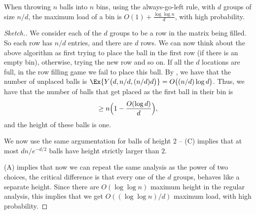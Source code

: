 \begin{theorem}
    When throwing $n$ balls into $n$ bins, using the always-go-left
    rule, with $d$ groups of size $n/d$, the maximum load of a bin is
    $O(1) + \tfrac{\log \log n}{d}$, with high probability.
\end{theorem}
\begin{proof}[Sketch.]
    We consider each of the $d$ groups to be a row in the matrix being
    filled. So each row has $n/d$ entries, and there are $d$ rows. We
    can now think about the above algorithm as first trying to place
    the ball in the first row (if there is an empty bin), otherwise,
    trying the new row and so on. If all the $d$ locations are full,
    in the row filling game we fail to place this ball.  By
     , we have that the
    number of unplaced balls is
    $\Ex{\bigl. Y\bigl(d,n/d, (n/d) d\bigr)} = O\bigl( (n/d) \log d
    \bigr) $.  Thus, we have that the number of balls that get placed
    as the first ball in their bin is
    \begin{equation*}
        \geq n\Bigl(1-\frac{O(\log d)}{d}\Bigr),
    \end{equation*}
    and the height of these balls is one.

    We now use the same argumentation for balls of height 2 --
     (C) implies that at most $dn/e^{-d/2}$
    balls have height strictly larger than $2$. 

     (A) implies that now we can repeat the same
    analysis as the power of two choices, the critical difference is
    that every one of the $d$ groups, behaves like a separate height.
    Since there are $O( \log \log n)$ maximum height in the regular
    analysis, this implies that we get $O( (\log \log n)/d)$ maximum
    load, with high probability.
\end{proof}

